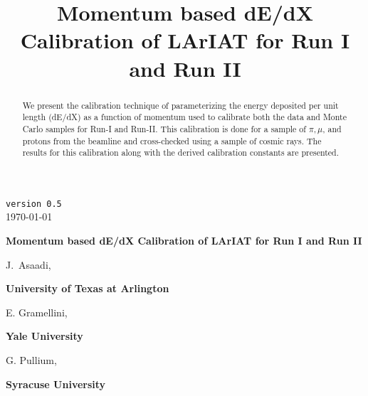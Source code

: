 \documentclass[a4paper]{article}
\title{Momentum based dE/dX Calibration of LArIAT for Run I and Run II}
\begin{document}
\def\Journal#1#2#3#4{{#1} {\bf #2}, #3 (#4)}
\def\etal{{\it et\ al.}}
\def\numunue{\nu_\mu\rightarrow\nu_e}
\def\numunutau{\nu_\mu\rightarrow\nu_\tau}
\def\nuebar{\bar\nu_e}
\def\nue{\nu_e}
\def\nutau{\nu_\tau}
\def\numubar{\bar\nu_\mu}
\def\numu{\nu_\mu}
\def\ra{\rightarrow}
\def\numubarnuebar{\bar\nu_\mu\rightarrow\bar\nu_e}
\def\nuebarnumubar{\bar\nu_e\rightarrow\bar\nu_\mu}
\def\osc{\rightsquigarrow}
\def\inteni{{\cal I}_{pot}}
\def\fmerit{{\cal F}}
\begin{flushright}
{\tt version 0.5}\\ 
\today
\end{flushright}
\vspace*{0.6cm}
\begin{center}
{\Large \bf Momentum based dE/dX Calibration of LArIAT for Run I and Run II} 
\vspace*{1.6cm}
\setcounter{footnote}{0}  
\def\A{\kern+.6ex\lower.42ex\hbox{$\scriptstyle \iota$}\kern-1.20ex a}
\def\E{\kern+.5ex\lower.42ex\hbox{$\scriptstyle \iota$}\kern-1.10ex e}
\small
\newcommand{\Aname}[2]{#1}
\def\titlefoot#1{\vspace{-0.3cm}\begin{center}{\bf #1}\end{center}}

\Aname{J.~Asaadi}{UTA},

\titlefoot{University of Texas at Arlington\label{UTA}}

\Aname{E. Gramellini}{Yale},

\titlefoot{Yale University\label{Yale}}

\Aname{G. Pullium}{Syracuse},

\titlefoot{Syracuse University\label{Syracuse}}

\end{center}
\vspace*{1cm}


\begin{abstract}

We present the calibration technique of parameterizing the energy deposited per unit length (dE/dX) as a function of momentum used to calibrate both the data and Monte Carlo samples for Run-I and Run-II. This calibration is done for a sample of $\pi, \mu$, and protons from the beamline and cross-checked using a sample of cosmic rays. The results for this calibration along with the derived calibration constants are presented.

\end{abstract} 
\end{document}
